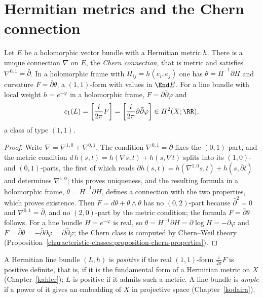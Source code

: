 \section{Hermitian metrics and the Chern connection}\label{holomorphic-bundles:section-chern-connection}

\begin{theorem}\label{holomorphic-bundles:theorem-chern-connection}
Let $E$ be a holomorphic vector bundle with a Hermitian metric $h$. There is a unique connection $\nabla$ on $E$, the \emph{Chern connection}, that is metric and satisfies $\nabla^{0,1} = \bar\partial$. In a
holomorphic frame with $H_{ij} = h(e_i, e_j)$ one has $\theta = \overline{H}^{-1}\partial\overline{H}$ and curvature $F = \bar\partial\theta$, a $(1,1)$-form with values in $\End E$. For a line bundle with local
weight $h = e^{-\varphi}$ in a holomorphic frame, $F = \partial\bar\partial\varphi$ and
\[
c_1(L) = \left[\frac{i}{2\pi}F\right] = \left[\frac{i}{2\pi}\partial\bar\partial\varphi\right] \in H^2(X; \RR),
\]
a class of type $(1,1)$.
\end{theorem}

\begin{proof}
Write $\nabla = \nabla^{1,0} + \nabla^{0,1}$. The condition $\nabla^{0,1} = \bar\partial$ fixes the $(0,1)$-part, and the metric condition
$d\,h(s, t) = h(\nabla s, t) + h(s, \nabla t)$ splits into its $(1,0)$- and $(0,1)$-parts, the first of which reads $\partial h(s, t) = h(\nabla^{1,0}s, t) + h(s, \bar\partial t)$ and determines $\nabla^{1,0}$; this
proves uniqueness, and the resulting formula in a holomorphic frame, $\theta = \overline{H}^{-1}\partial\overline{H}$, defines a connection with the two properties, which proves existence. Then
$F = d\theta + \theta \wedge \theta$ has no $(0,2)$-part because $\bar\partial^2 = 0$ and $\nabla^{0,1} = \bar\partial$, and no $(2,0)$-part by the metric condition; the formula $F = \bar\partial\theta$ follows. For a
line bundle $H = e^{-\varphi}$ is real, so $\theta = H^{-1}\partial H = \partial\log H = -\partial\varphi$ and $F = \bar\partial\theta = -\bar\partial\partial\varphi = \partial\bar\partial\varphi$; the Chern class is
computed by Chern--Weil theory (Proposition~\ref{characteristic-classes:proposition-chern-properties}).
\end{proof}

\begin{definition}\label{holomorphic-bundles:definition-positive}
A Hermitian line bundle $(L, h)$ is \emph{positive} if the real $(1,1)$-form $\frac{i}{2\pi}F$ is positive definite, that is, if it is the fundamental form of a Hermitian metric on $X$
(Chapter~\ref{kahler}); $L$ is positive if it admits such a metric. A line bundle is \emph{ample} if a power of it gives an embedding of $X$ in projective space
(Chapter~\ref{kodaira}).
\end{definition}

